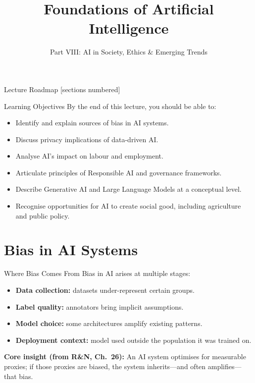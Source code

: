 \documentclass[10pt]{beamer}
\title{Foundations of Artificial Intelligence}
\subtitle{Part VIII: AI in Society, Ethics \& Emerging Trends}
\institute{Department of Computer Science}
\date{}
\begin{document}
\maketitle

\begin{frame}{Lecture Roadmap}
    [sections numbered]
    \tableofcontents[hideallsubsections]
\end{frame}

\begin{frame}{Learning Objectives}
    By the end of this lecture, you should be able to:
    \begin{itemize}
        \item Identify and explain sources of bias in AI systems.
        \item Discuss privacy implications of data-driven AI.
        \item Analyse AI's impact on labour and employment.
        \item Articulate principles of Responsible AI and governance frameworks.
        \item Describe Generative AI and Large Language Models at a conceptual level.
        \item Recognise opportunities for AI to create social good, including agriculture and public policy.
    \end{itemize}
\end{frame}

\section{Bias in AI Systems}

\begin{frame}{Where Bias Comes From}
    Bias in AI arises at multiple stages:
    \begin{itemize}
        \item \textbf{Data collection:} datasets under-represent certain groups.
        \item \textbf{Label quality:} annotators bring implicit assumptions.
        \item \textbf{Model choice:} some architectures amplify existing patterns.
        \item \textbf{Deployment context:} model used outside the population it was trained on.
    \end{itemize}

    \vspace{0.2cm}
    \textbf{Core insight (from R\&N, Ch.~26):}
    An AI system optimises for measurable proxies; if those proxies are biased, the system inherits---and often amplifies---that bias.
\end{frame}
\end{document}
